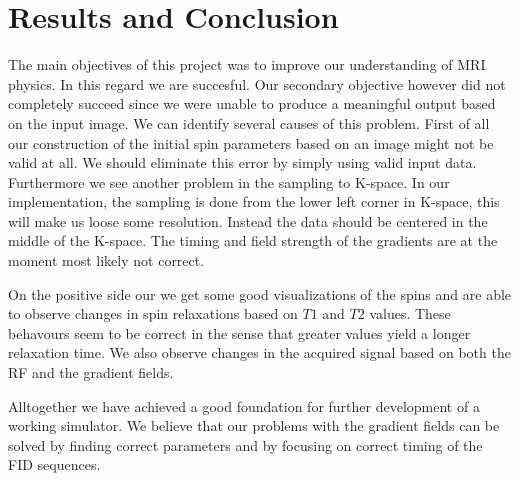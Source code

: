 \section{Results and Conclusion}

The main objectives of this project was to improve our understanding
of MRI physics. In this regard we are succesful. Our secondary
objective however did not completely succeed since we were unable to
produce a meaningful output based on the input image. We can identify
several causes of this problem. First of all our construction of the
initial spin parameters based on an image might not be valid at
all. We should eliminate this error by simply using valid input data.
Furthermore we see another problem in the sampling to K-space. In our
implementation, the sampling is done from the lower left corner in
K-space, this will make us loose some resolution. Instead the data
should be centered in the middle of the K-space. The timing and field
strength of the gradients are at the moment most likely not correct. 

On the positive side our we get some good visualizations of the spins
and are able to observe changes in spin relaxations based on $T1$ and
$T2$ values. These behavours seem to be correct in the sense that
greater values yield a longer relaxation time. We also observe changes
in the acquired signal based on both the RF and the gradient fields.

Alltogether we have achieved a good foundation for further development
of a working simulator. We believe that our problems with the gradient
fields can be solved by finding correct parameters and by focusing on
correct timing of the FID sequences.



